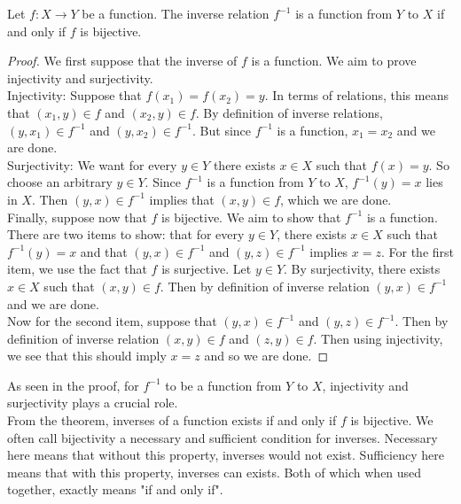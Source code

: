 \documentclass[a4paper]{article}
\begin{document}
\begin{thm}{}{} Let $f:X\to Y$ be a function. The inverse relation $f^{-1}$ is a function from $Y$ to $X$ if and only if $f$ is bijective. 
\begin{proof}
We first suppose that the inverse of $f$ is a function. We aim to prove injectivity and surjectivity. \\
Injectivity: Suppose that $f(x_1)=f(x_2)=y$. In terms of relations, this means that $(x_1,y)\in f$ and $(x_2,y)\in f$. By definition of inverse relations, $(y,x_1)\in f^{-1}$ and $(y,x_2)\in f^{-1}$. But since $f^{-1}$ is a function, $x_1=x_2$ and we are done. \\
Surjectivity: We want for every $y\in Y$ there exists $x\in X$ such that $f(x)=y$. So choose an arbitrary $y\in Y$. Since $f^{-1}$ is a function from $Y$ to $X$, $f^{-1}(y)=x$ lies in $X$. Then $(y,x)\in f^{-1}$ implies that $(x,y)\in f$, which we are done. \\

Finally, suppose now that $f$ is bijective. We aim to show that $f^{-1}$ is a function. There are two items to show: that for every $y\in Y$, there exists $x\in X$ such that $f^{-1}(y)=x$ and that $(y,x)\in f^{-1}$ and $(y,z)\in f^{-1}$ implies $x=z$. For the first item, we use the fact that $f$ is surjective. Let $y\in Y$. By surjectivity, there exists $x\in X$ such that $(x,y)\in f$. Then by definition of inverse relation $(y,x)\in f^{-1}$ and we are done. \\
Now for the second item, suppose that $(y,x)\in f^{-1}$ and $(y,z)\in f^{-1}$. Then by definition of inverse relation $(x,y)\in f$ and $(z,y)\in f$. Then using injectivity, we see that this should imply $x=z$ and so we are done. 
\end{proof}
\end{thm}

As seen in the proof, for $f^{-1}$ to be a function from $Y$ to $X$, injectivity and surjectivity plays a crucial role. \\
From the theorem, inverses of a function exists if and only if $f$ is bijective. We often call bijectivity a necessary and sufficient condition for inverses. Necessary here means that without this property, inverses would not exist. Sufficiency here means that with this property, inverses can exists. Both of which when used together, exactly means "if and only if". 
\end{document}
